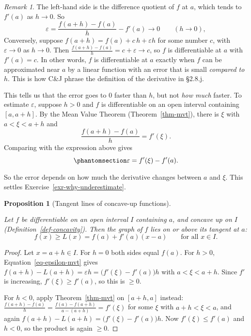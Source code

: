 \documentclass[
  letterpaper,
  DIV=11,
  numbers=noendperiod]{scrreprt}
\theoremstyle{plain}
\theoremstyle{plain}
\newtheorem{proposition}{Proposition}[chapter]
\theoremstyle{definition}
\theoremstyle{definition}
\theoremstyle{definition}
\theoremstyle{plain}
\theoremstyle{plain}
\theoremstyle{remark}
\newtheorem{refremark}{Remark}[chapter]
\begin{document}
\begin{refremark}
The left-hand side is the difference quotient of \(f\) at \(a\), which
tends to \(f'(a)\) as \(h\to0\). So \[
\varepsilon= \frac{f(a+h)-f(a)}{h} - f'(a) \longrightarrow 0 \qquad (h\to0) ,
\] Conversely, suppose \(f(a+h) = f(a) + c\,h + \varepsilon h\) for some
number \(c\), with \(\varepsilon\to0\) as \(h\to0\). Then
\(\frac{f(a+h)-f(a)}{h} = c + \varepsilon\to c\), so \(f\) is
differentiable at \(a\) with \(f'(a)=c\). In other words, \(f\) is
differentiable at \(a\) exactly when \(f\) can be approximated near
\(a\) by a linear function with an error that is small \emph{compared to
\(h\)}. This is how C\&J phrase the definition of the derivative in
§2.8.j.

\label{rem-epsilon-differentiability}

\end{refremark}

This tells us that the error goes to \(0\) faster than \(h\), but not
\emph{how much} faster. To estimate \(\varepsilon\), suppose \(h>0\) and
\(f\) is differentiable on an open interval containing \([a,a+h]\). By
the Mean Value Theorem (Theorem~\ref{thm-mvt}), there is \(\xi\) with
\(a<\xi<a+h\) and \[
\frac{f(a+h)-f(a)}{h} = f'(\xi) .
\] Comparing with the expression above gives
\begin{equation}\protect\phantomsection\label{eq-epsilon-mvt}{
\varepsilon= f'(\xi) - f'(a) .
}\end{equation}

So the error depends on how much the derivative changes between \(a\)
and \(\xi\). This settles Exercise~\ref{exr-why-underestimate}.

\begin{proposition}[Tangent lines of concave-up
functions]\protect\hypertarget{prp-tangent-below-graph}{}\label{prp-tangent-below-graph}

Let \(f\) be differentiable on an open interval \(I\) containing \(a\),
and concave up on \(I\) (Definition~\ref{def-concavity}). Then the graph
of \(f\) lies on or above its tangent at \(a\): \[
f(x) \ge L(x) = f(a) + f'(a)(x-a) \qquad\text{for all } x\in I .
\]

\end{proposition}

\begin{proof}
Let \(x=a+h\in I\). For \(h=0\) both sides equal \(f(a)\). For \(h>0\),
Equation~\ref{eq-epsilon-mvt} gives
\(f(a+h) - L(a+h) = \varepsilon h = \big(f'(\xi)-f'(a)\big)h\) with
\(a<\xi<a+h\). Since \(f'\) is increasing, \(f'(\xi)\ge f'(a)\), so this
is \(\ge0\).

For \(h<0\), apply Theorem~\ref{thm-mvt} on \([a+h,a]\) instead:
\(\frac{f(a+h)-f(a)}{h} = \frac{f(a)-f(a+h)}{a-(a+h)} = f'(\xi)\) for
some \(\xi\) with \(a+h<\xi<a\), and again
\(f(a+h)-L(a+h) = \big(f'(\xi)-f'(a)\big)h\). Now \(f'(\xi)\le f'(a)\)
and \(h<0\), so the product is again \(\ge0\).
\end{proof}
\end{document}
